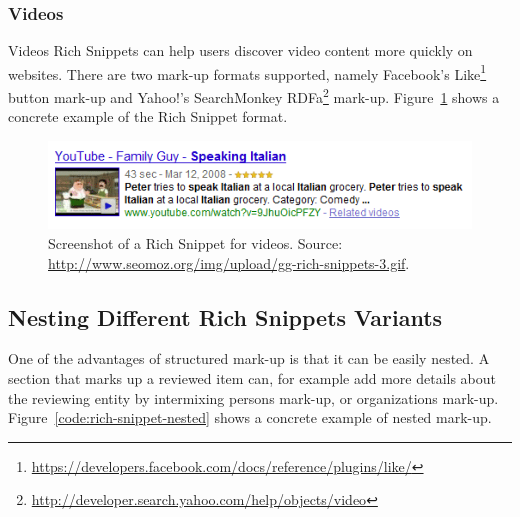 \documentclass[12pt]{article}
\begin{document}
\subsubsection{Videos}
Videos Rich Snippets can help users discover video content more quickly on websites. There are two mark-up formats supported, namely Facebook's Like\footnote{\url{https://developers.facebook.com/docs/reference/plugins/like/}} button mark-up and Yahoo!'s SearchMonkey RDFa\footnote{\url{http://developer.search.yahoo.com/help/objects/video}} mark-up. Figure~\ref{fig:rich-snippets-videos} shows a concrete example of the Rich Snippet format.
\begin{figure}[htbp!]
\begin{center}
  \includegraphics[width=0.75\linewidth]{./resources/rich-snippets-videos.png}
    \caption[Screenshot of a Rich Snippet for videos.]{Screenshot of a Rich Snippet for videos. Source: \url{http://www.seomoz.org/img/upload/gg-rich-snippets-3.gif}.}
  \label{fig:rich-snippets-videos}
  \end{center}  
\end{figure}

\subsection{Nesting Different Rich Snippets Variants}
One of the advantages of structured mark-up is that it can be easily nested. A section that marks up a reviewed item can, for example add more details about the reviewing entity by intermixing persons mark-up, or organizations mark-up. Figure~\ref{code:rich-snippet-nested} shows a concrete example of nested mark-up.
\end{document}
